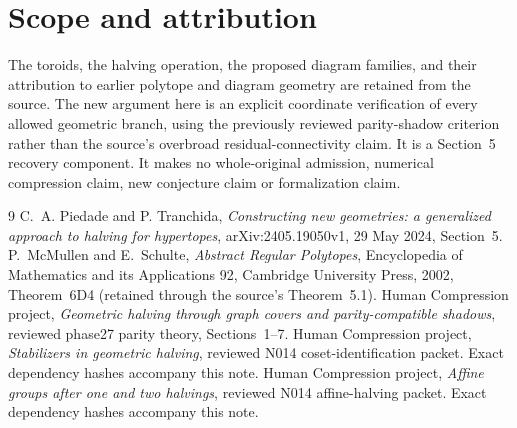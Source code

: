 \documentclass[11pt,a4paper]{article}
\begin{document}
\section{Scope and attribution}
The toroids, the halving operation, the proposed diagram families,
and their attribution to earlier polytope and diagram geometry are
retained from the source. The new argument here is an explicit
coordinate verification of every allowed geometric branch, using
the previously reviewed parity-shadow criterion rather than the
source's overbroad residual-connectivity claim. It is a Section~5
recovery component. It makes no whole-original admission, numerical
compression claim, new conjecture claim or formalization claim.

\begin{thebibliography}{9}
 C.~A. Piedade and P. Tranchida,
\emph{Constructing new geometries: a generalized approach to halving
for hypertopes}, arXiv:2405.19050v1, 29 May 2024, Section~5.
 P.~McMullen and E.~Schulte,
\emph{Abstract Regular Polytopes}, Encyclopedia of Mathematics and
its Applications 92, Cambridge University Press, 2002,
Theorem~6D4 (retained through the source's Theorem~5.1).
 Human Compression project,
\emph{Geometric halving through graph covers and parity-compatible
shadows}, reviewed phase27 parity theory, Sections~1--7.
 Human Compression project,
\emph{Stabilizers in geometric halving}, reviewed N014
coset-identification packet. Exact dependency hashes accompany this note.
 Human Compression project,
\emph{Affine groups after one and two halvings}, reviewed N014
affine-halving packet. Exact dependency hashes accompany this note.
\end{thebibliography}
\end{document}
